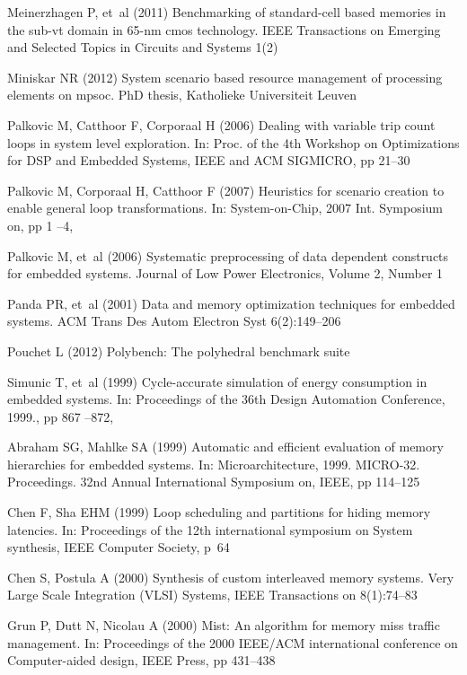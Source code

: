 \documentclass[smallextended]{svjour3}
\begin{document}
\begin{thebibliography}{40}
Meinerzhagen P, et~al (2011) Benchmarking of standard-cell based memories in
  the sub-vt domain in 65-nm cmos technology. IEEE Transactions on Emerging and
  Selected Topics in Circuits and Systems 1(2)

Miniskar NR (2012) System scenario based resource management of processing
  elements on mpsoc. PhD thesis, Katholieke Universiteit Leuven

Palkovic M, Catthoor F, Corporaal H (2006{}) Dealing with variable
  trip count loops in system level exploration. In: Proc. of the 4th Workshop
  on Optimizations for DSP and Embedded Systems, IEEE and ACM SIGMICRO, pp
  21--30

Palkovic M, Corporaal H, Catthoor F (2007) Heuristics for scenario creation to
  enable general loop transformations. In: System-on-Chip, 2007 Int. Symposium
  on, pp 1 --4, 

Palkovic M, et~al (2006{}) Systematic preprocessing of data
  dependent constructs for embedded systems. Journal of Low Power Electronics,
  Volume 2, Number 1

Panda PR, et~al (2001) Data and memory optimization techniques for embedded
  systems. ACM Trans Des Autom Electron Syst 6(2):149--206

Pouchet L (2012) Polybench: The polyhedral benchmark suite

Simunic T, et~al (1999) Cycle-accurate simulation of energy consumption in
  embedded systems. In: Proceedings of the 36th Design Automation Conference,
  1999., pp 867 --872, 
  
Abraham SG, Mahlke SA (1999) Automatic and efficient evaluation of memory
  hierarchies for embedded systems. In: Microarchitecture, 1999. MICRO-32.
  Proceedings. 32nd Annual International Symposium on, IEEE, pp 114--125

Chen F, Sha EHM (1999) Loop scheduling and partitions for hiding memory
  latencies. In: Proceedings of the 12th international symposium on System
  synthesis, IEEE Computer Society, p~64

Chen S, Postula A (2000) Synthesis of custom interleaved memory systems. Very
  Large Scale Integration (VLSI) Systems, IEEE Transactions on 8(1):74--83

Grun P, Dutt N, Nicolau A (2000) Mist: An algorithm for memory miss traffic
  management. In: Proceedings of the 2000 IEEE/ACM international conference on
  Computer-aided design, IEEE Press, pp 431--438


\end{thebibliography}
\end{document}
